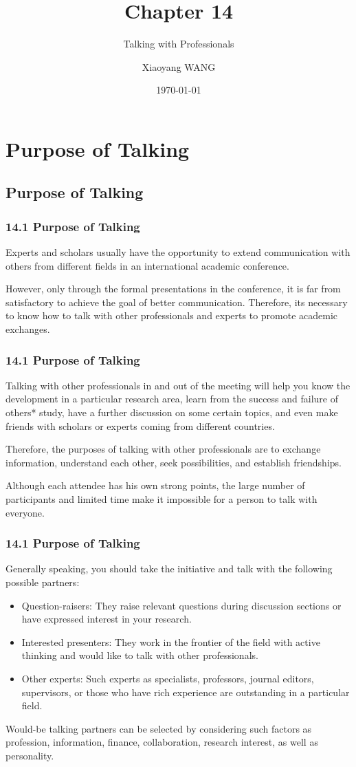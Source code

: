 \documentclass[aspectratio=169,UTF8,c]{beamer}%
\title{Chapter 14}
\subtitle{Talking with Professionals}
\author{Xiaoyang WANG}
\date{\today}
\institute{Linyi University}
\begin{document}
\maketitle

\makeoutline

\section{Purpose of Talking}
\subsection{Purpose of Talking}
\begin{frame}
	\frametitle{14.1 Purpose of Talking}
	Experts and scholars usually have the opportunity to extend communication with others from different fields in an international academic conference. 
	
	However, only through the formal presentations in the conference, it is far from satisfactory to achieve the goal of better communication. Therefore, its necessary to know how to talk with other professionals and experts to promote academic exchanges.
\end{frame}
\begin{frame}
	\frametitle{14.1 Purpose of Talking}
	Talking with other professionals in and out of the meeting will help you know the development in a particular research area, learn from the success and failure of others* study, have a further discussion on some certain topics, and even make friends with scholars or experts coming from different countries. 
	
	Therefore, the purposes of talking with other professionals are to exchange information, understand each other, seek possibilities, and establish friendships.
	
	Although each attendee has his own strong points, the large number of participants and limited time make it impossible for a person to talk with everyone. 
\end{frame}
\begin{frame}
	\frametitle{14.1 Purpose of Talking}
	Generally speaking, you should take the initiative and talk with the following possible partners:
	\begin{itemize}
		\item Question-raisers: They raise relevant questions during discussion sections or have expressed interest in your research.
		\item Interested presenters: They work in the frontier of the field with active thinking and would like to talk with other professionals.
		\item Other experts: Such experts as specialists, professors, journal editors, supervisors, or those who have rich experience are outstanding in a particular field.	
	\end{itemize}

	Would-be talking partners can be selected by considering such factors as profession, information, finance, collaboration, research interest, as well as personality.
\end{frame}
\end{document}

